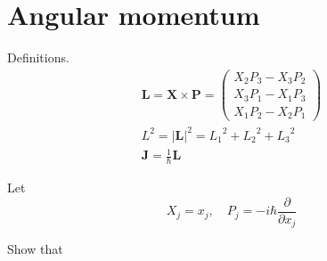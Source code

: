 

\section*{Angular momentum}

Definitions.
\begin{gather*}
\mathbf L=\mathbf X\times\mathbf P
=\begin{pmatrix}
X_2P_3-X_3P_2
\\
X_3P_1-X_1P_3
\\
X_1P_2-X_2P_1
\end{pmatrix}
\\[1ex]
L^2=|\mathbf L|^2={L_1}^2+{L_2}^2+{L_3}^2
\\[1ex]
\mathbf J=\frac{1}{\hbar}\mathbf L
\end{gather*}

Let
\begin{equation*}
X_j=x_j,\quad P_j=-i\hbar\frac{\partial}{\partial x_j}
\end{equation*}

Show that

